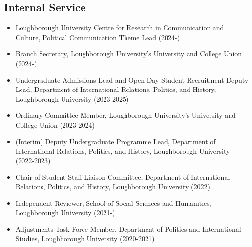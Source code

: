 \documentclass[letterpaper,fontsize=10.5pt]{scrartcl}
\begin{document}
\subsection{Internal Service}
\begin{itemize}[itemsep=0em, topsep=0em, partopsep=0em]
	\item Loughborough University Centre for Research in Communication and Culture, Political Communication Theme Lead (2024-)
	\item Branch Secretary, Loughborough University's University and College Union (2024-)
	\item Undergraduate Admissions Lead and Open Day Student Recruitment Deputy Lead, Department of International Relations, Politics, and History, Loughborough University (2023-2025)
	\item Ordinary Committee Member, Loughborough University's University and College Union (2023-2024)
	\item (Interim) Deputy Undergraduate Programme Lead, Department of International Relations, Politics, and History, Loughborough University (2022-2023)
	\item Chair of Student-Staff Liaison Committee, Department of International Relations, Politics, and History, Loughborough University (2022)
	\item Independent Reviewer, School of Social Sciences and Humanities, Loughborough University (2021-)
	\item Adjustments Task Force Member, Department of Politics and International Studies, Loughborough University (2020-2021)\\
\end{itemize}
\end{document}
